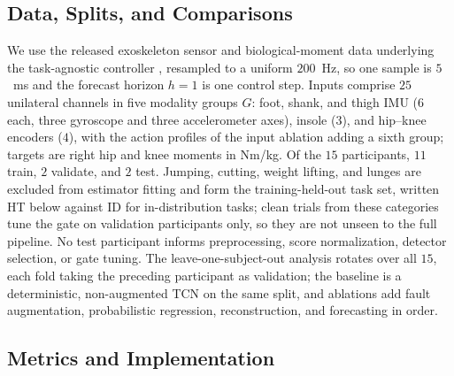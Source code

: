 \documentclass[letterpaper]{article} %
\begin{document}
\subsection{Data, Splits, and Comparisons}

We use the released exoskeleton sensor and biological-moment data underlying the task-agnostic controller \citep{molinaro2024task,scherpereel2023dataset}, resampled to a uniform $200$~Hz, so one sample is $5$~ms and the forecast horizon $h=1$ is one control step.
Inputs comprise $25$ unilateral channels in five modality groups $G$: foot, shank, and thigh IMU ($6$ each, three gyroscope and three accelerometer axes), insole ($3$), and hip--knee encoders ($4$), with the action profiles of the input ablation adding a sixth group; targets are right hip and knee moments in Nm/kg.
Of the $15$ participants, $11$ train, $2$ validate, and $2$ test. Jumping, cutting, weight lifting, and lunges are excluded from estimator fitting and form the training-held-out task set, written HT below against ID for in-distribution tasks; clean trials from these categories tune the gate on validation participants only, so they are not unseen to the full pipeline. No test participant informs preprocessing, score normalization, detector selection, or gate tuning. The leave-one-subject-out analysis rotates over all $15$, each fold taking the preceding participant as validation; the baseline is a deterministic, non-augmented TCN on the same split, and ablations add fault augmentation, probabilistic regression, reconstruction, and forecasting in order.

\subsection{Metrics and Implementation}
\end{document}
